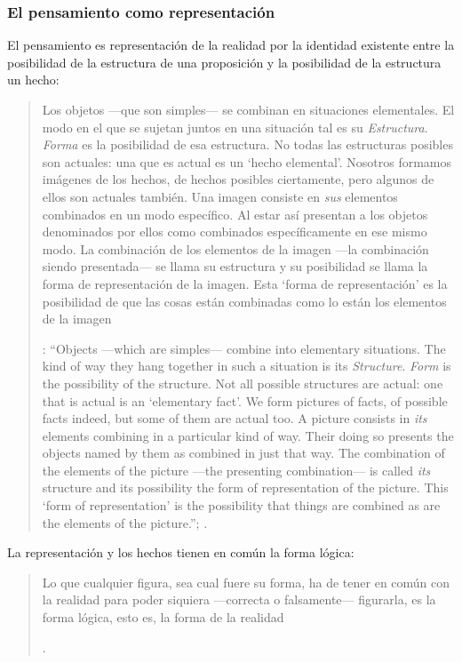 \subsubsection{El pensamiento como representación}

El pensamiento es representación de la realidad por la identidad existente entre la posibilidad de la estructura de una proposición y la posibilidad de la estructura un hecho: \blockquote[{\Cite[171]{anscombe2011plato:simplicity}}: \enquote{Objects ---which are simples--- combine into elementary situations. The kind of way they hang together in such a situation is its \emph{Structure}. \emph{Form} is the possibility of the structure. Not all possible structures are actual: one that is actual is an `elementary fact'. We form pictures of facts, of possible facts indeed, but some of them are actual too. A picture consists in \emph{its} elements combining in a particular kind of way. Their doing so presents the objects named by them as combined in just that way. The combination of the elements of the picture ---the presenting combination--- is called \emph{its} structure and its possibility the form of representation of the picture. This `form of representation' is the possibility that things are combined as are the elements of the picture.}; {\cite[Cf.][\S2.15]{wittgenstein1922tractatuses}}.]{Los objetos ---que son simples--- se combinan en situaciones elementales. El modo en el que se sujetan juntos en una situación tal es su \emph{Estructura}. \emph{Forma} es la posibilidad de esa estructura. No todas las estructuras posibles son actuales: una que es actual es un `hecho elemental'. Nosotros formamos imágenes de los hechos, de hechos posibles ciertamente, pero algunos de ellos son actuales también. Una imagen consiste en \emph{sus} elementos combinados en un modo específico. Al estar así presentan a los objetos denominados por ellos como combinados específicamente en ese mismo modo. La combinación de los elementos de la imagen ---la combinación siendo presentada--- se llama su estructura y su posibilidad se llama la forma de representación de la imagen. Esta `forma de representación' es la posibilidad de que las cosas están combinadas como lo están los elementos de la imagen}.

La representación y los hechos tienen en común la forma lógica: \blockquote[{\Cite[\S2.18]{wittgenstein1922tractatuses}}.]{Lo que cualquier figura, sea cual fuere su forma, ha de tener en común con la realidad para poder siquiera ---correcta o falsamente--- figurarla, es la forma lógica, esto es, la forma de la realidad}.

